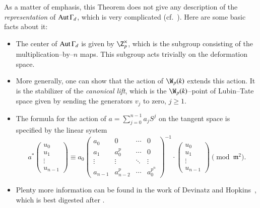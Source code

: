 \begin{remark}\label{StablizerRepIsComplicated}
As a matter of emphasis, this Theorem does not give any description of the \emph{representation} of $\operatorname{Aut} \Gamma_d$, which is very complicated (cf.\ ).  Here are some basic facts about it:
\begin{itemize}
    \item The center of $\operatorname{Aut} \Gamma_d$ is given by $\Z_p^\times$, which is the subgroup consisting of the multiplication--by--$n$ maps.  This subgroup acts trivially on the deformation space.
    \item More generally, one can show that the action of $\W_p(k)$ extends this action.  It is the stabilizer of the \textit{canonical lift}, which is the $\W_p(k)$--point of Lubin--Tate space given by sending the generators $v_j$ to zero, $j \ge 1$.
    \item The formula for the action of $a = \sum_{j=0}^{n-1} a_j S^j$ on the tangent space is specified by the linear system \[a^* \left( \begin{array}{c} u_0 \\ u_1 \\ \vdots \\ u_{n-1} \end{array}\right) \equiv a_0 \left( \begin{array}{cccc} a_0 & 0 & \cdots & 0 \\ a_1 & a_0^p & \cdots & 0 \\ \vdots & \vdots & \ddots & \vdots \\ a_{n-1} & a_{n-2}^p & \cdots & a_0^{p^n} \end{array} \right)^{-1} \cdot \left( \begin{array}{c} u_0 \\ u_1 \\ \vdots \\ u_{n-1} \end{array} \right) \pmod{\mathfrak{m}^2}.\]
    \item Plenty more information can be found in the work of Devinatz and Hopkins~\cite{DevinatzHopkins}, which is best digested after .
\end{itemize}
\end{remark}

